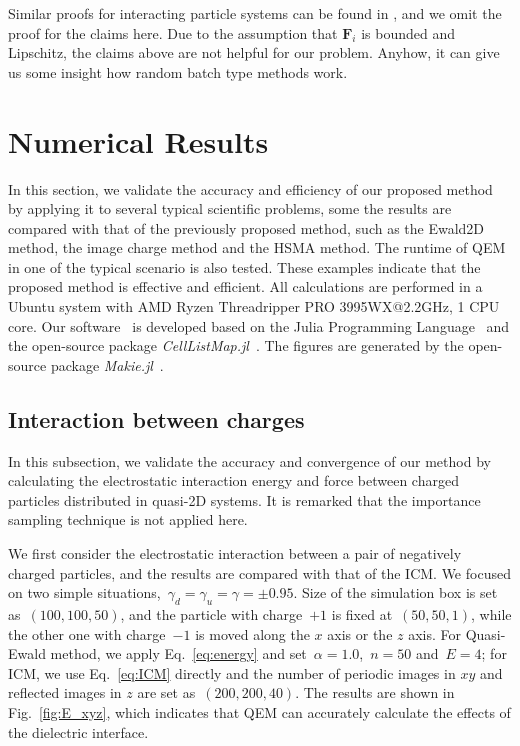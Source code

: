 Similar proofs for interacting particle systems can be found in \cite{jin2020convergence,li2019stochastic,li2020random}, and we omit the proof for the claims here.  Due to the assumption that $\bm{F}_i$ is bounded and Lipschitz, the claims above are not helpful for our problem. Anyhow, it can give us some insight how random batch type methods work.

\section{Numerical Results}
\label{sec:result}

In this section, we validate the accuracy and efficiency of our proposed method by applying it to several typical scientific problems, some the results are compared with that of the previously proposed method, such as the Ewald2D method, the image charge method and the HSMA method.
The runtime of QEM in one of the typical scenario is also tested.
These examples indicate that the proposed method is effective and efficient.
All calculations are performed in a Ubuntu system with AMD Ryzen Threadripper PRO 3995WX@2.2GHz, 1 CPU core.
Our software~\cite{QuasiEwald} is developed based on the Julia Programming Language~\cite{Julia-2017} and the open-source package \emph{CellListMap.jl}~\cite{celllistmap}.
The figures are generated by the open-source package \emph{Makie.jl}~\cite{DanischKrumbiegel2021}.

\subsection{Interaction between charges}

In this subsection, we validate the accuracy and convergence of our method by calculating the electrostatic interaction energy and force between charged particles distributed in quasi-2D systems.
It is remarked that the importance sampling technique is not applied here.

We first consider the electrostatic interaction between a pair of negatively charged particles, and the results are compared with that of the ICM.
We focused on two simple situations,~$\gamma_{d} = \gamma_{u} = \gamma = \pm 0.95$.
Size of the simulation box is set as~$(100, 100, 50)$, and the particle with charge~$+1$ is fixed at~$(50, 50, 1)$, while the other one with charge~$-1$ is moved along the $x$ axis or the $z$ axis.
For Quasi-Ewald method, we apply Eq.~\eqref{eq:energy} and set~$\alpha = 1.0$,~$n = 50$ and~$E = 4$; for ICM, we use Eq.~\eqref{eq:ICM} directly and the number of periodic images in $xy$ and reflected images in $z$ are set as~$(200, 200, 40)$.
The results are shown in Fig.~\ref{fig:E_xyz}, which indicates that QEM can accurately calculate the effects of the dielectric interface.

